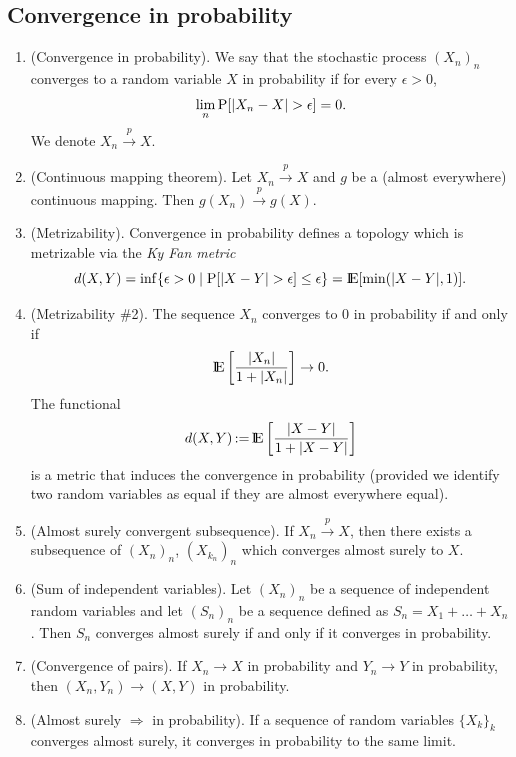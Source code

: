 \documentclass[a4paper,10pt]{scrbook}
\begin{document}
\subsection{Convergence in probability}       
\begin{enumerate}
 \item (Convergence in probability). We say that the stochastic process $(X_n)_n$ converges to a random variable $X$
       in probability if for every $\epsilon>0$,
       \[
        \lim_n \prob[|X_n-X|>\epsilon] = 0.
       \]
       We denote $X_n \overset{p}{\to} X$.
 \item (Continuous mapping theorem). Let $X_n \overset{p}{\to} X$ and $g$ be a (almost everywhere) continuous mapping. Then
       $g(X_n) \overset{p}{\to} g(X)$.
 \item (Metrizability). Convergence in probability defines a topology which is metrizable via the \textit{Ky Fan metric}
      \[
	d(X,Y) = \inf \{\epsilon>0 {}\mid{} \prob[|X-Y|>\epsilon]\leq \epsilon\} = \E[\min(|X-Y|,1)].
      \]
 \item (Metrizability \#2). 
       The sequence $X_n$ converges to $0$ in probability if and only if
       \[
        \E\left[ \frac{|X_n|}{1+|X_n|}\right] \to 0.
       \]
       The functional 
       \[
        d(X,Y) \dfn \E\left[ \frac{|X - Y|}{1+|X - Y|}\right]
       \]
       is a metric that induces the convergence in probability (provided we identify two random variables
       as equal if they are almost everywhere equal).
 \item (Almost surely convergent subsequence). 
       If $X_n \overset{p}{\to} X$, then there exists a subsequence of $(X_n)_n$, 
       $(X_{k_n})_n$ which converges almost surely to $X$.
       
 \item (Sum of independent variables). Let $(X_n)_n$ be a sequence of independent random 
       variables and let $(S_n)_n$ be a sequence defined as $S_n = X_1 + \ldots + X_n$.
       Then $S_n$ converges almost surely if and only if it converges in probability.      
 
 \item (Convergence of pairs). If $X_n\to X$ in probability and $Y_n\to Y$ in probability, then
       $(X_n, Y_n)\to (X,Y)$ in probability.
       
 \item (Almost surely $\Rightarrow$ in probability). If a sequence of random variables $\{X_k\}_k$ 
       converges almost surely, it converges in probability to the same limit.
       

\end{enumerate}
\end{document}
